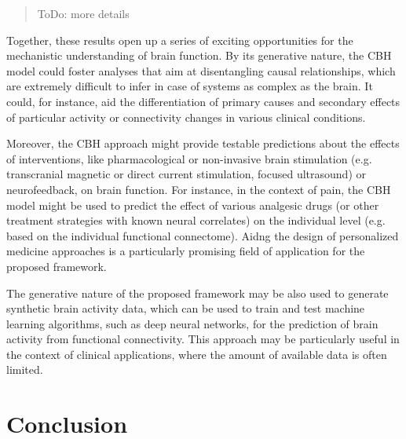 \documentclass{article}
\begin{document}
\begin{quote}
ToDo: more details
\end{quote}

Together, these results open up a series of exciting opportunities for the mechanistic understanding of brain function. By its generative nature, the CBH model could foster analyses that aim at disentangling causal relationships, which are extremely difficult to infer in case of systems as complex as the brain. It could, for instance, aid the differentiation of primary causes and secondary effects of particular activity or connectivity changes in various clinical conditions.

Moreover, the CBH approach might provide testable predictions about the effects of interventions, like pharmacological or non-invasive brain stimulation (e.g. transcranial magnetic or direct current stimulation, focused ultrasound) or neurofeedback, on brain function.
For instance, in the context of pain, the CBH model might be used to predict the effect of various analgesic drugs (or other treatment strategies with known neural correlates) on the individual level (e.g. based on the individual functional connectome).
Aidng the design of personalized medicine approaches is a particularly promising field of application for the proposed framework.

The generative nature of the proposed framework may be also used to generate synthetic brain activity data, which can be used to train and test machine learning algorithms, such as deep neural networks, for the prediction of brain activity from functional connectivity. This approach may be particularly useful in the context of clinical applications, where the amount of available data is often limited.

\section{Conclusion}\label{Conclusion}
\end{document}
